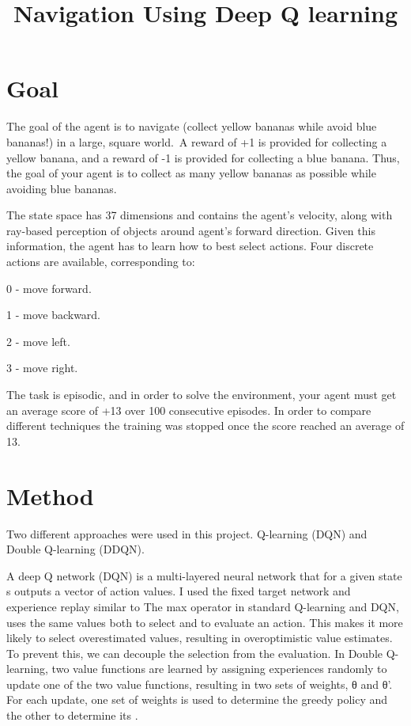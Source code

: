 \documentclass[]{article}
\title{Navigation Using Deep Q learning }
\author{}
\begin{document}
\maketitle


\section{Goal}


The goal of the agent is to navigate (collect yellow bananas while avoid blue bananas!) in a large, square world.\
A reward of +1 is provided for collecting a yellow banana, and a reward of -1 is provided for collecting a blue banana.  Thus, the goal of your agent is to collect as many yellow bananas as possible while avoiding blue bananas.  

The state space has 37 dimensions and contains the agent's velocity, along with ray-based perception of objects around agent's forward direction.  Given this information, the agent has to learn how to best select actions.  Four discrete actions are available, corresponding to:

\begin{list}{}{}
	\item  0 - move forward.
	\item  1 - move backward.
	\item  2 - move left.
	\item  3 - move right.
\end{list}
The task is episodic, and in order to solve the environment, your agent must get an average score of +13 over 100 consecutive episodes. In order to compare different techniques the training was stopped once the score reached an average of 13. 
 

\section{Method}
Two different approaches were used in this project.
Q-learning (DQN) and Double Q-learning (DDQN).


A deep Q network (DQN) is a multi-layered neural network that for a given state s outputs a vector of action values. I used the fixed target network and experience replay similar to \cite{mnih2015human}
The max operator in standard Q-learning and DQN, uses the same values both to select and to evaluate
an action. This makes it more likely to select overestimated values, resulting in overoptimistic value estimates. To prevent
this, we can decouple the selection from the evaluation. In Double Q-learning, two value functions
are learned by assigning experiences randomly to update
one of the two value functions, resulting in two sets of
weights, θ and θ'. For each update, one set of weights is used to determine the greedy policy and the other to determine its \cite{hasselt2010double}. 
\end{document}
